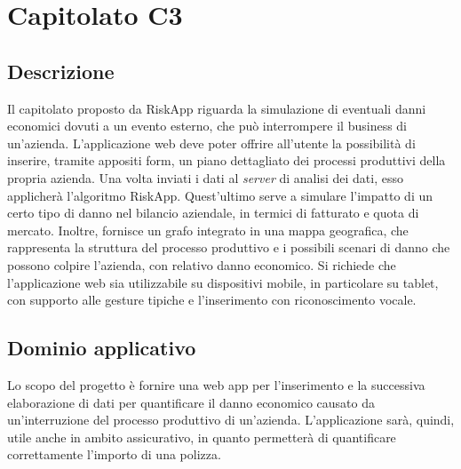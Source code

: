 \newpage
\section{Capitolato C3}

\subsection{Descrizione}

Il capitolato proposto da RiskApp riguarda la simulazione di eventuali danni economici dovuti a un evento esterno, che può interrompere il business di un'azienda. L’applicazione web deve poter offrire all’utente la possibilità di inserire, tramite appositi form, un piano dettagliato dei processi produttivi della propria azienda. Una volta inviati i dati al \textit{server} di analisi dei dati, esso applicherà l'algoritmo RiskApp. Quest'ultimo serve a simulare l'impatto di un certo tipo di danno nel bilancio aziendale, in termici di fatturato e quota di mercato. Inoltre, fornisce un grafo integrato in una mappa geografica, che rappresenta la struttura del processo produttivo e i possibili scenari di danno che possono colpire l’azienda, con relativo danno economico. Si richiede che l'applicazione web sia utilizzabile su dispositivi mobile, in particolare su tablet, con supporto alle gesture tipiche e l'inserimento con riconoscimento vocale.

\subsection{Dominio applicativo}

Lo scopo del progetto è fornire una web app per l'inserimento e la successiva elaborazione di dati per quantificare il danno economico causato da un'interruzione del processo produttivo di un'azienda. L'applicazione sarà, quindi, utile anche in ambito assicurativo, in quanto permetterà di quantificare correttamente l'importo di una polizza.


